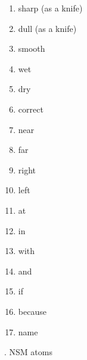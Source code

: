\begin{enumerate}
\item   sharp (as a knife) 

\item   dull (as a knife) 

\item   smooth 

\item   wet 

\item   dry 

\item   correct 

\item   near 

\item   far 

\item   right 

\item   left 

\item   at 

\item   in 

\item   with 

\item   and 

\item   if 

\item   because 

\item   name 
\end{enumerate}



. NSM atoms

